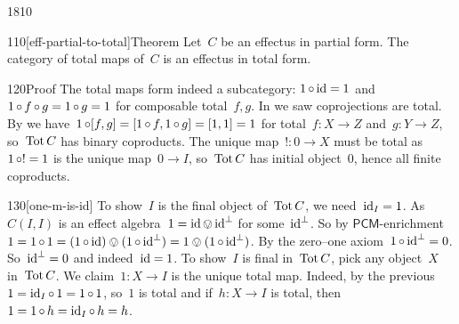 \begin{parsec}{1810}
\begin{point}{110}[eff-partial-to-total]{Theorem}%
Let~$C$ be an effectus in partial form.
The category of total maps of~$C$ is an effectus in total form.
\begin{point}{120}{Proof}%
The total maps form indeed a subcategory: $1 \mathop{\circ} \operatorname{id} = 1$
    and $1 \mathop{\circ} f \mathop{\circ} g = 1 \mathop{\circ} g = 1$ for composable total~$f,g$.
In  we saw coprojections are total.
By 
    we have~$1 \mathop{\circ} [f,g] = [1 \mathop{\circ} f, 1 \mathop{\circ} g] = [1,1] = 1$
    for total~$f\colon X \to Z$ and~$g\colon Y \to Z$,
    so~$\operatorname{Tot} C$ has binary coproducts.
The unique map~$!\colon 0 \to X$ must be total
    as~$1 \mathop{\circ} ! = 1$ is the unique map~$0 \to I$,
    so~$\operatorname{Tot} C$ has initial object~$0$, hence all finite coproducts.
\end{point}
\begin{point}{130}[one-m-is-id]%
To show~$I$ is the final object of~$\operatorname{Tot} C$,
    we need~$\operatorname{id}_I = 1$.
As~$C(I,I)$ is an effect algebra~$1 = \operatorname{id} \ovee \operatorname{id}^\perp$
    for some~$\operatorname{id}^\perp$.
    So by $\mathsf{PCM}$-enrichment~$1 = 1 \mathop{\circ} 1 = (1 \mathop{\circ} \operatorname{id}) \ovee (1 \mathop{\circ}\operatorname{id}^\perp) = 
1 \ovee (1 \mathop{\circ} \operatorname{id}^\perp)$.
By the zero--one axiom~$1 \mathop{\circ} \operatorname{id}^\perp = 0$.
So~$\operatorname{id}^\perp = 0$ and indeed~$\operatorname{id} = 1$.
To show~$I$ is final in~$\operatorname{Tot} C$, pick any object~$X$ in~$\operatorname{Tot} C$.
We claim~$1 \colon X \to I$ is the unique total map.
Indeed, by the previous $1 = \operatorname{id}_I \mathop{\circ} 1 = 1 \mathop{\circ} 1$, so~$1$ is total
and if~$h\colon X \to I$ is total, then~$1=1 \mathop{\circ} h = \operatorname{id}_I \mathop{\circ} h = h$.
\end{point}
\end{point}
\end{parsec}
